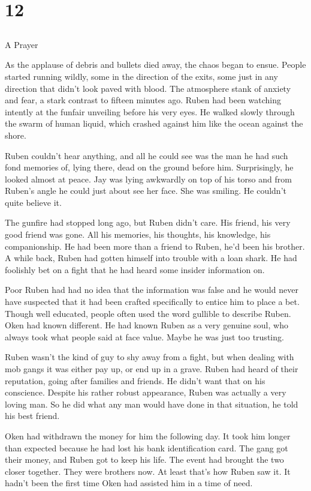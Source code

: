 \chapter{12}
\section{}
A Prayer  

As the applause of debris and bullets died away, the chaos began to ensue.  People started running wildly, some in the direction of the exits, some just in any direction that didn't look paved with blood.  The atmosphere stank of anxiety and fear, a stark contrast to fifteen minutes ago.  Ruben had been watching intently at the funfair unveiling before his very eyes.  He walked slowly through the swarm of human liquid, which crashed against him like the ocean against the shore.

Ruben couldn't hear anything, and all he could see was the man he had such fond memories of, lying there, dead on the ground before him.  Surprisingly, he looked almost at peace.  Jay was lying awkwardly on top of his torso and from Ruben's angle he could just about see her face.  She was smiling.  He couldn't quite believe it.

The gunfire had stopped long ago, but Ruben didn't care.  His friend, his very good friend was gone.  All his memories, his thoughts, his knowledge, his companionship.  He had been more than a friend to Ruben, he'd been his brother.  A while back, Ruben had gotten himself into trouble with a loan shark.  He had foolishly bet on a fight that he had heard some insider information on.  

Poor Ruben had had no idea that the information was false and he would never have suspected that it had been crafted specifically to entice him to place a bet.  Though well educated, people often used the word gullible to describe Ruben.  Oken had known different.  He had known Ruben as a very genuine soul, who always took what people said at face value.  Maybe he was just too trusting.

Ruben wasn't the kind of guy to shy away from a fight, but when dealing with mob gangs it was either pay up, or end up in a grave.  Ruben had heard of their reputation, going after families and friends.  He didn't want that on his conscience.  Despite his rather robust appearance, Ruben was actually a very loving man.  So he did  what any man would have done in that situation, he told his best friend.

Oken had withdrawn the money for him the following day.  It took him longer than expected because he had lost his bank identification card.  The gang got their money, and Ruben got to keep his life.  The event had brought the two closer together.  They were brothers now.  At least that's how Ruben saw it.  It hadn't been the first time Oken had assisted him in a time of need.

